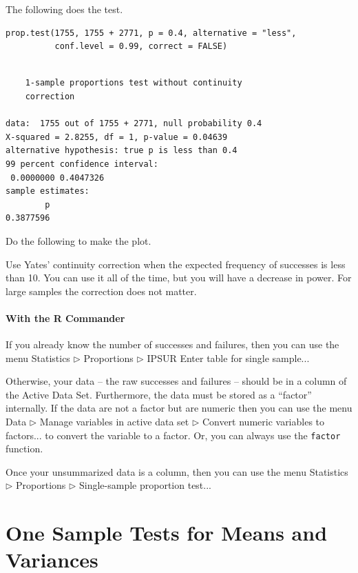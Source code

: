\documentclass[captions=tableheading]{scrbook}
\begin{document}
The following does the test.


\begin{verbatim}
prop.test(1755, 1755 + 2771, p = 0.4, alternative = "less", 
          conf.level = 0.99, correct = FALSE)
\end{verbatim}


\begin{verbatim}

	1-sample proportions test without continuity
	correction

data:  1755 out of 1755 + 2771, null probability 0.4 
X-squared = 2.8255, df = 1, p-value = 0.04639
alternative hypothesis: true p is less than 0.4 
99 percent confidence interval:
 0.0000000 0.4047326 
sample estimates:
        p 
0.3877596
\end{verbatim}

Do the following to make the plot.


Use Yates' continuity correction when the expected frequency of successes is less than 10. You can use it all of the time, but you will have a decrease in power. For large samples the correction does not matter. 

\paragraph*{With the \textsf{R} Commander}

If you already know the number of successes and failures, then you can use the menu \textsf{Statistics \(\triangleright\) Proportions \(\triangleright\) IPSUR Enter table for single sample}...

Otherwise, your data -- the raw successes and failures -- should be in a column of the Active Data Set. Furthermore, the data must be stored as a ``factor'' internally. If the data are not a factor but are numeric then you can use the menu \textsf{Data \(\triangleright\) Manage variables in active data set \(\triangleright\) Convert numeric variables to factors}... to convert the variable to a factor. Or, you can always use the \texttt{factor} function.

Once your unsummarized data is a column, then you can use the menu \textsf{Statistics \(\triangleright\) Proportions \(\triangleright\) Single-sample proportion test}...
\section{One Sample Tests for Means and Variances}
\label{sec-10-2}
\end{document}
